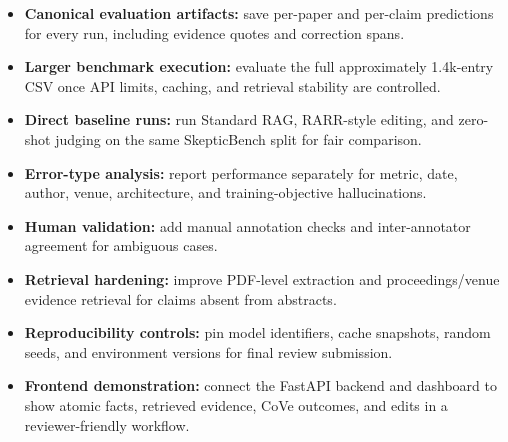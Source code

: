 \documentclass[12pt, a4paper]{report}
\begin{document}
\begin{itemize}
    \item \textbf{Canonical evaluation artifacts:} save per-paper and per-claim predictions for every run, including evidence quotes and correction spans.
    \item \textbf{Larger benchmark execution:} evaluate the full approximately 1.4k-entry CSV once API limits, caching, and retrieval stability are controlled.
    \item \textbf{Direct baseline runs:} run Standard RAG, RARR-style editing, and zero-shot judging on the same SkepticBench split for fair comparison.
    \item \textbf{Error-type analysis:} report performance separately for metric, date, author, venue, architecture, and training-objective hallucinations.
    \item \textbf{Human validation:} add manual annotation checks and inter-annotator agreement for ambiguous cases.
    \item \textbf{Retrieval hardening:} improve PDF-level extraction and proceedings/venue evidence retrieval for claims absent from abstracts.
    \item \textbf{Reproducibility controls:} pin model identifiers, cache snapshots, random seeds, and environment versions for final review submission.
    \item \textbf{Frontend demonstration:} connect the FastAPI backend and dashboard to show atomic facts, retrieved evidence, CoVe outcomes, and edits in a reviewer-friendly workflow.
\end{itemize}
\end{document}
